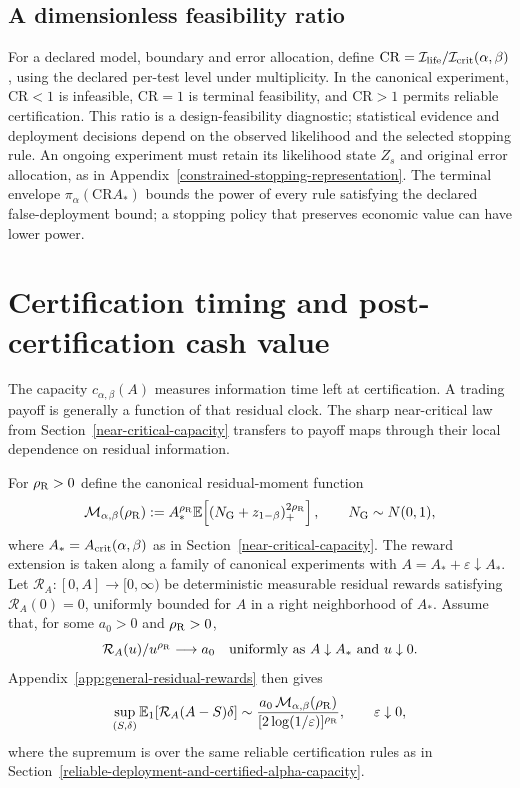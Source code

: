 \documentclass[11pt]{article}
\numberwithin{equation}{section}
\theoremstyle{plain}
\theoremstyle{definition}
\theoremstyle{remark}
\newcommand{\Eone}{\mathbb E_1}
\begin{document}
\subsection{A dimensionless feasibility ratio}\label{certifiability-ratio}
For a declared model, boundary and error allocation, define $\mathrm{CR}=\mathcal I_{\rm life}/\mathcal I_{\rm crit}(\alpha,\beta)$, using the declared per-test level under multiplicity. In the canonical experiment, $\mathrm{CR}<1$ is infeasible, $\mathrm{CR}=1$ is terminal feasibility, and $\mathrm{CR}>1$ permits reliable certification. This ratio is a design-feasibility diagnostic; statistical evidence and deployment decisions depend on the observed likelihood and the selected stopping rule. An ongoing experiment must retain its likelihood state $Z_s$ and original error allocation, as in Appendix~\ref{constrained-stopping-representation}. The terminal envelope $\pi_\alpha(\mathrm{CR}A_*)$ bounds the power of every rule satisfying the declared false-deployment bound; a stopping policy that preserves economic value can have lower power.

\section{Certification timing and post-certification cash value}\label{sharp-economic-capacity}

The capacity $c_{\alpha,\beta}(A)$ measures information time left at certification. A trading payoff is generally a function of that residual clock. The sharp near-critical law from Section~\ref{near-critical-capacity} transfers to payoff maps through their local dependence on residual information.

For $\rho_{\rm R}>0$ define the canonical residual-moment function
\begin{equation}\label{eq:residual-moment-function}
\mathcal M_{\alpha,\beta}(\rho_{\rm R})
:=A_*^{\rho_{\rm R}}
\mathbb E\!\left[(N_{\rm G}+z_{1-\beta})_+^{2\rho_{\rm R}}\right],
\qquad N_{\rm G}\sim N(0,1),
\end{equation}
where $A_*=A_{\rm crit}(\alpha,\beta)$ as in Section~\ref{near-critical-capacity}.
The reward extension is taken along a family of canonical experiments with
$A=A_*+\varepsilon\downarrow A_*$. Let $\mathcal R_A:[0,A]\to[0,\infty)$
be deterministic measurable residual rewards satisfying $\mathcal R_A(0)=0$,
uniformly bounded for $A$ in a right neighborhood of $A_*$. Assume that,
for some $a_0>0$ and $\rho_{\rm R}>0$,
\[
\mathcal R_A(u)/u^{\rho_{\rm R}}\longrightarrow a_0
\quad\text{uniformly as }A\downarrow A_*\text{ and }u\downarrow0.
\]
Appendix~\ref{app:general-residual-rewards} then gives
\begin{equation}\label{eq:general-residual-reward}
\sup_{(S,\delta)}\Eone\!\left[\mathcal R_A(A-S)\delta\right]
\sim
\frac{a_0\,\mathcal M_{\alpha,\beta}(\rho_{\rm R})}{[2\log(1/\varepsilon)]^{\rho_{\rm R}}},
\qquad \varepsilon\downarrow0,
\end{equation}
where the supremum is over the same reliable certification rules as in Section~\ref{reliable-deployment-and-certified-alpha-capacity}.
\end{document}
